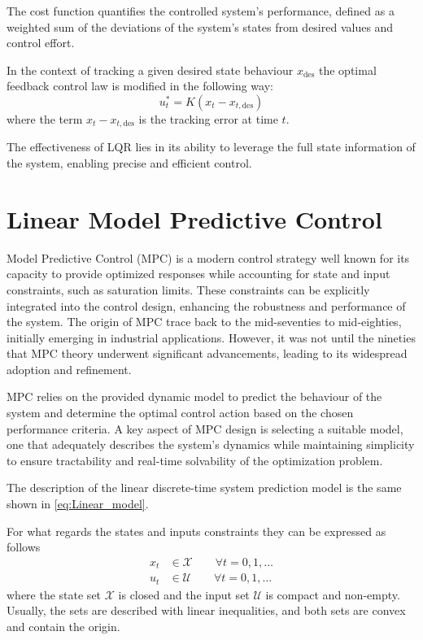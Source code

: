 \documentclass[a4paper,12pt,oneside]{book}
\begin{document}
The cost function quantifies the controlled system's performance, defined as a weighted sum of the deviations of the system's states from desired values and control effort.

In the context of tracking a given desired state behaviour $x_{\text{des}}$ the optimal feedback control law is modified in the following way:
\begin{equation}
    u_t^* = K (x_t - x_{t,\text{des}})
\label{Closed-loop_control_law}
\end{equation}
where the term $x_t - x_{t,\text{des}}$ is the tracking error at time $t$.

The effectiveness of LQR lies in its ability to leverage the full state information of the system, enabling precise and efficient control.


\section{Linear Model Predictive Control}
Model Predictive Control (MPC) is a modern control strategy well known for its capacity to provide optimized responses while accounting for state and input constraints, such as saturation limits.
These constraints can be explicitly integrated into the control design, enhancing the robustness and performance of the system. 
The origin of MPC trace back to the mid-seventies to mid-eighties, initially emerging in industrial applications. 
However, it was not until the nineties that MPC theory underwent significant advancements, leading to its widespread adoption and refinement.

\bigskip
MPC relies on the provided dynamic model to predict the behaviour of the system and determine the optimal control action based on the chosen performance criteria. 
A key aspect of MPC design is selecting a suitable model, one that adequately describes the system's dynamics while maintaining simplicity to ensure tractability and real-time solvability of the optimization problem.

\bigskip
The description of the linear discrete-time system prediction model is the same shown in \eqref{eq:Linear_model}.

For what regards the states and inputs constraints they can be expressed as follows
\begin{align}
    x_t & \in \mathcal{X} \quad \quad \forall t = 0,1, \ldots \\
    u_t & \in \mathcal{U} \quad \quad \forall t = 0,1, \ldots
\end{align}
where the state set $\mathcal{X}$ is closed and the input set $\mathcal{U}$ is compact and non-empty. 
Usually, the sets are described with linear inequalities, and both sets are convex and contain the origin.
\end{document}
